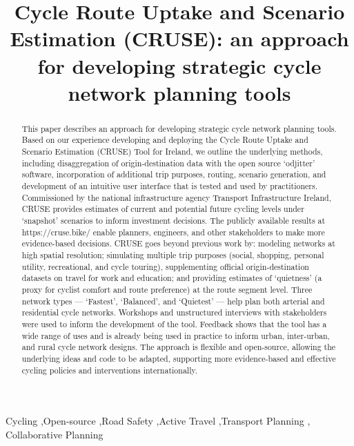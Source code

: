 \documentclass[
  super,
  preprint,
  3p]{elsarticle}
\begin{document}
\begin{frontmatter}
\title{Cycle Route Uptake and Scenario Estimation (CRUSE): an approach
for developing strategic cycle network planning tools}


        
\begin{abstract}
This paper describes an approach for developing strategic cycle network
planning tools. Based on our experience developing and deploying the
Cycle Route Uptake and Scenario Estimation (CRUSE) Tool for Ireland, we
outline the underlying methods, including disaggregation of
origin-destination data with the open source `odjitter' software,
incorporation of additional trip purposes, routing, scenario generation,
and development of an intuitive user interface that is tested and used
by practitioners. Commissioned by the national infrastructure agency
Transport Infrastructure Ireland, CRUSE provides estimates of current
and potential future cycling levels under `snapshot' scenarios to inform
investment decisions. The publicly available results at
https://cruse.bike/ enable planners, engineers, and other stakeholders
to make more evidence-based decisions. CRUSE goes beyond previous work
by: modeling networks at high spatial resolution; simulating multiple
trip purposes (social, shopping, personal utility, recreational, and
cycle touring), supplementing official origin-destination datasets on
travel for work and education; and providing estimates of `quietness' (a
proxy for cyclist comfort and route preference) at the route segment
level. Three network types --- `Fastest', `Balanced', and `Quietest' ---
help plan both arterial and residential cycle networks. Workshops and
unstructured interviews with stakeholders were used to inform the
development of the tool. Feedback shows that the tool has a wide range
of uses and is already being used in practice to inform urban,
inter-urban, and rural cycle network designs. The approach is flexible
and open-source, allowing the underlying ideas and code to be adapted,
supporting more evidence-based and effective cycling policies and
interventions internationally.
\end{abstract}





\begin{keyword}
    Cycling \sep Open-source \sep Road Safety \sep Active
Travel \sep Transport Planning \sep 
    Collaborative Planning
\end{keyword}
\end{frontmatter}
    
\end{document}
